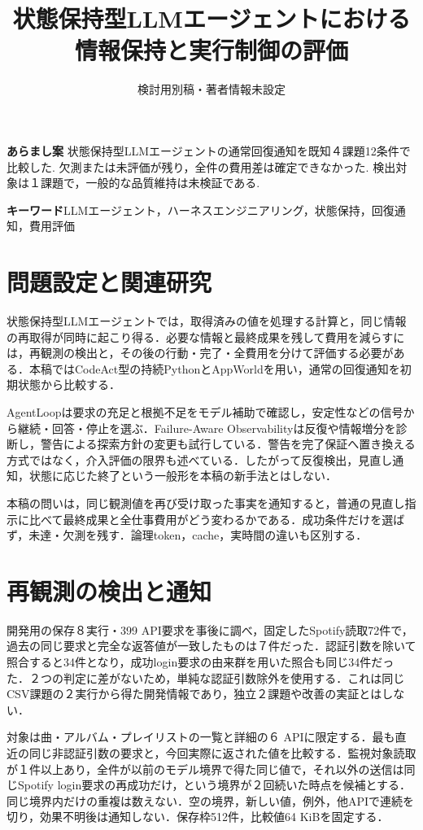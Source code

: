 \documentclass[uplatex,a4paper,twocolumn,10pt]{jsarticle}
\title{状態保持型LLMエージェントにおける\newline 情報保持と実行制御の評価}
\author{検討用別稿・著者情報未設定}
\date{}
\begin{document}
\raggedbottom
\maketitle
\noindent\textbf{あらまし案}\quad
状態保持型LLMエージェントの通常回復通知を既知４課題12条件で比較した. 欠測または未評価が残り，全件の費用差は確定できなかった. 検出対象は１課題で，一般的な品質維持は未検証である.

\noindent\textbf{キーワード}\quad LLMエージェント，ハーネスエンジニアリング，状態保持，回復通知，費用評価

\section{問題設定と関連研究}
状態保持型LLMエージェントでは，取得済みの値を処理する計算と，同じ情報の再取得が同時に起こり得る．必要な情報と最終成果を残して費用を減らすには，再観測の検出と，その後の行動・完了・全費用を分けて評価する必要がある．本稿ではCodeAct\cite{codeact}型の持続PythonとAppWorld\cite{appworld}を用い，通常の回復通知を初期状態から比較する．

AgentLoop\cite{agentloop}は要求の充足と根拠不足をモデル補助で確認し，安定性などの信号から継続・回答・停止を選ぶ．Failure-Aware Observability\cite{observability}は反復や情報増分を診断し，警告による探索方針の変更も試行している．警告を完了保証へ置き換える方式ではなく，介入評価の限界も述べている．したがって反復検出，見直し通知，状態に応じた終了という一般形を本稿の新手法とはしない．

本稿の問いは，同じ観測値を再び受け取った事実を通知すると，普通の見直し指示に比べて最終成果と全仕事費用がどう変わるかである．成功条件だけを選ばず，未達・欠測を残す．論理token，cache，実時間の違い\cite{costproxy}も区別する．

\section{再観測の検出と通知}
開発用の保存８実行・399 API要求を事後に調べ，固定したSpotify読取72件で，過去の同じ要求と完全な返答値が一致したものは７件だった．認証引数を除いて照合すると34件となり，成功login要求の由来群を用いた照合も同じ34件だった．２つの判定に差がないため，単純な認証引数除外を使用する．これは同じCSV課題の２実行から得た開発情報であり，独立２課題や改善の実証とはしない．

対象は曲・アルバム・プレイリストの一覧と詳細の６ APIに限定する．最も直近の同じ非認証引数の要求と，今回実際に返された値を比較する．監視対象読取が１件以上あり，全件が以前のモデル境界で得た同じ値で，それ以外の送信は同じSpotify login要求の再成功だけ，という境界が２回続いた時点を候補とする．同じ境界内だけの重複は数えない．空の境界，新しい値，例外，他APIで連続を切り，効果不明後は通知しない．保存枠512件，比較値64 KiBを固定する．
\end{document}
